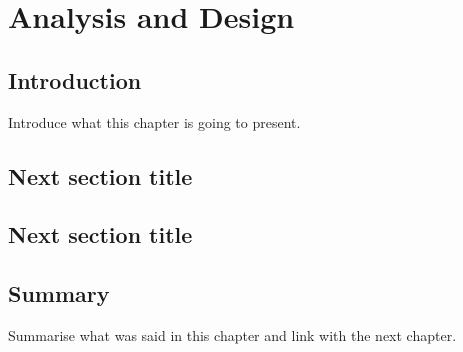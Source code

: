 \chapter{Analysis and Design}

\section{Introduction}
Introduce what this chapter is going to present.
\section{Next section title}

\section{Next section title}

\section{Summary}
Summarise what was said in this chapter and link with the next chapter.